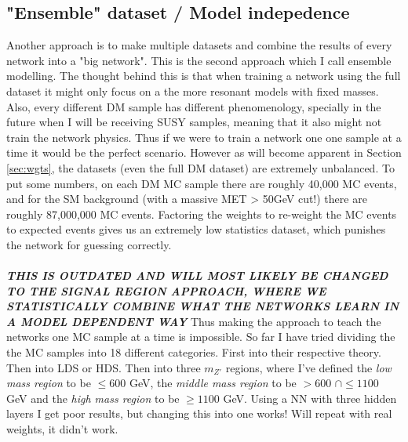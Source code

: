 \documentclass[14pt, a4paper]{book}
\begin{document}
\subsection{"Ensemble" dataset / Model indepedence}
Another approach is to make multiple datasets and combine the results of every network into a "big network". This is the second approach which I call ensemble modelling. The thought behind this is that when 
training a network using the full dataset it might only focus on a the more resonant models with fixed masses. Also, every different DM sample has different phenomenology, specially in the future when I will 
be receiving SUSY samples, meaning that it also might not train the network physics. Thus if we were to train a network one one sample at a time it would be the perfect scenario. 
However as will become apparent in Section \ref{sec:wgts}, the datasets (even the full DM dataset) are extremely unbalanced. To put some numbers, on each DM MC sample there are roughly 40,000 MC events, 
and for the SM background (with a massive MET > 50GeV cut!) there are roughly 87,000,000 MC events. Factoring the weights to re-weight the MC events to expected events gives us an extremely low statistics dataset, which punishes the network for guessing correctly. \\
\\\textit{\textbf{THIS IS OUTDATED AND WILL MOST LIKELY BE CHANGED TO THE SIGNAL REGION APPROACH, WHERE WE STATISTICALLY COMBINE WHAT THE NETWORKS LEARN IN A MODEL DEPENDENT WAY}} Thus making the approach to teach the networks one MC sample at a time is impossible. So far I have tried dividing the the MC samples into 18 different categories. First into their respective theory. 
Then into LDS or HDS. Then into three $m_{Z'}$ regions, where I've defined the \textit{low mass region} to be $\le 600$ GeV, the \textit{middle mass region} to be $>600$ $\cap\le 1100$ GeV and 
the\textit{ high mass region }to be $\ge 1100$ GeV. Using a NN with three hidden layers I get poor results, but changing this into one works! Will repeat with real weights, it didn't work. 
\end{document}

